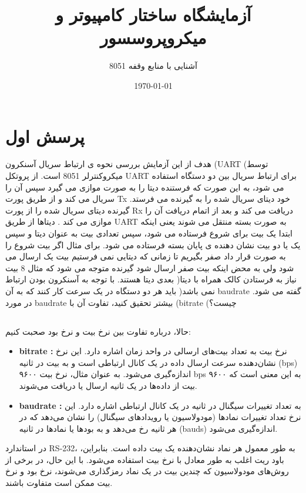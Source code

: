 \documentclass[11pt]{article}
\title{آزمایشگاه ساختار کامپیوتر و میکروپروسسور}
\subtitle{آشنایی با منابع وقفه 8051}
\date{\today}
\begin{document}
\maketitlepage
\maketitlestart

\section{پرسش اول}

هدف از این آزمایش بررسی نحوه ی ارتباط سریال آسنکرون (UART (توسط
میکروکنترلر 8051 است. از پروتکل UART برای ارتباط سریال بین دو دستگاه استفاده می
شود، به این صورت که فرستنده دیتا را به صورت موازی می گیرد سپس آن را سریال می
کند و از طریق پورت Tx خود دیتای سریال شده را به گیرنده می فرستد. گیرنده دیتای
سریال شده را از پورت Rx دریافت می کند و بعد از اتمام دریافت آن را موازی می کند .
دیتاها از طریق UART به صورت بسته منتقل می شوند یعنی اینکه ابتدا یک بیت برای شروع
فرستاده می شود، سپس تعدادی بیت به عنوان دیتا و سپس یک یا دو بیت نشان دهنده ی
پایان بسته فرستاده می شود. برای مثال اگر بیت شروع را به صورت قرار داد صفر بگیریم
تا زمانی که دیتایی نمی فرستیم بیت یک ارسال می شود ولی به محض اینکه بیت صفر ارسال
شود گیرنده متوجه می شود که مثال 8 بیت بعدی دیتا هستند. با توجه به آسنکرون بودن
ارتباط )نیاز به فرستادن کالک همراه با دیتا نمی باشد( باید هر دو دستگاه در یک سرعت
کار کنند که به آن baudrate گفته می شود. در مورد baudrate بیشتر تحقیق کنید، تفاوت
آن با (bitrate (چیست؟ 

\subsection{}

حالا، درباره تفاوت بین نرخ بیت و نرخ بود صحبت کنیم:

\begin{itemize}
	\item \textbf{bitrate : } نرخ بیت به تعداد بیت‌های ارسالی در واحد زمان اشاره دارد. این نرخ نشان‌دهنده سرعت ارسال داده در یک کانال ارتباطی است و به بیت در ثانیه (bps) اندازه‌گیری می‌شود. به عنوان مثال، نرخ بیت ۹۶۰۰ bps به این معنی است که ۹۶۰۰ بیت از داده‌ها در یک ثانیه ارسال یا دریافت می‌شوند.
	\item \textbf{baudrate : } به تعداد تغییرات سیگنال در ثانیه در یک کانال ارتباطی اشاره دارد. این نرخ تعداد تغییرات نمادها (مودولاسیون یا رویدادهای سیگنال) را نشان می‌دهد که در هر ثانیه رخ می‌دهد و به بودها یا نمادها در ثانیه (bauds) اندازه‌گیری می‌شود.
\end{itemize}

در استاندارد RS-232، به طور معمول هر نماد نشان‌دهنده یک بیت داده است. بنابراین، باود ریت اغلب به طور معادل با نرخ بیت استفاده می‌شود. با این حال، در برخی از روش‌های مودولاسیون که چندین بیت در یک نماد رمزگذاری می‌شوند، نرخ بود و نرخ بیت ممکن است متفاوت باشند.
\end{document}
